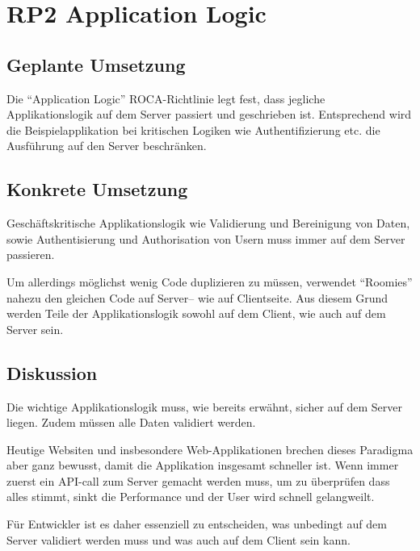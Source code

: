 \section{RP2 Application Logic}
\label{sec:principle-rp2-application-logic}

\subsection*{Geplante Umsetzung}
Die ``Application Logic'' ROCA-Richtlinie legt fest, dass jegliche Applikationslogik
auf dem Server passiert und geschrieben ist.
Entsprechend wird die Beispielapplikation bei kritischen Logiken wie Authentifizierung
etc. die Ausführung auf den Server beschränken.

\subsection*{Konkrete Umsetzung}
Geschäftskritische Applikationslogik wie Validierung und Bereinigung von Daten, sowie
Authentisierung und Authorisation von Usern muss immer auf dem Server passieren.

Um allerdings möglichst wenig Code duplizieren zu müssen, verwendet ``Roomies''
nahezu den gleichen Code auf Server-- wie auf Clientseite. Aus diesem Grund werden
Teile der Applikationslogik sowohl auf dem Client, wie auch auf dem Server sein.

\subsection*{Diskussion}
Die wichtige Applikationslogik muss, wie bereits erwähnt, sicher auf dem Server liegen.
Zudem müssen alle Daten validiert werden.

Heutige Websiten und insbesondere Web-Applikationen brechen dieses Paradigma aber
ganz bewusst, damit die Applikation insgesamt schneller ist. Wenn immer zuerst ein
API-call zum Server gemacht werden muss, um zu überprüfen dass alles stimmt, sinkt
die Performance und der User wird schnell gelangweilt.

Für Entwickler ist es daher essenziell zu entscheiden, was unbedingt auf dem Server
validiert werden muss und was auch auf dem Client sein kann.